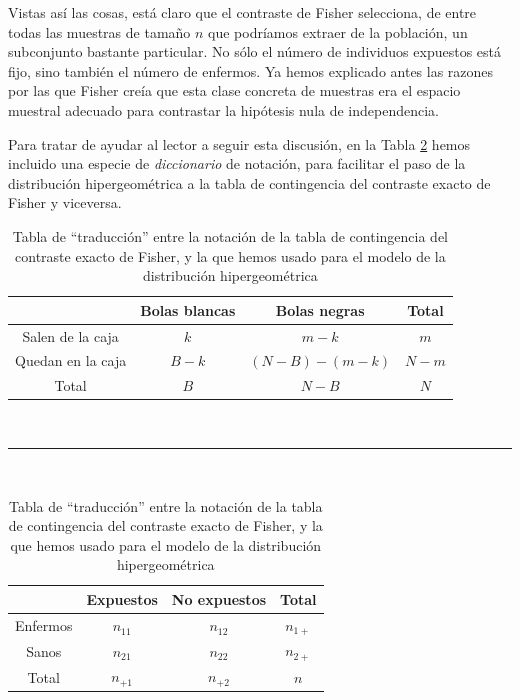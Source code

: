 Vistas así las cosas, está claro que el contraste de Fisher selecciona, de entre todas las muestras de tamaño $n$ que podríamos extraer de la población, un subconjunto bastante particular. No sólo el número de individuos expuestos está fijo, sino también el número de enfermos. Ya hemos explicado antes las razones por las que Fisher creía que esta clase concreta de muestras era el espacio muestral adecuado para contrastar la hipótesis nula de independencia.

Para tratar de ayudar al lector a seguir esta discusión, en la Tabla \ref{cap12:tabla:TraduccionFisherHipergeometrica} hemos incluido una especie de {\em diccionario} de notación, para facilitar el paso de la distribución hipergeométrica a la tabla de contingencia del contraste exacto de Fisher y viceversa.

\begin{table}[ht]
        \begin{center}
        \begin{tabular}{|c|c|c|c|}
          \cline{2-4}
           \multicolumn{1}{c|}{}& Bolas blancas&  Bolas negras & Total \\
           \hline
          Salen de la caja& $k$ & $m-k$ & $m$ \\
          \hline
          Quedan en la caja& $B-k$ & $(N-B)-(m-k)$ &  $N-m$\\
          \hline
          \multicolumn{1}{|c|}{Total} & $B$ & $N-B$ & $N$ \\
          \hline
        \end{tabular}\\[3mm]

        \hrule
        \quad\\[3mm]

        \begin{tabular}{|c|c|c|c|}
          \cline{2-4}
           \multicolumn{1}{c|}{}& Expuestos&  No expuestos & Total \\
           \hline
          Enfermos& $n_{11}$ & $n_{12}$ & $n_{1+}$ \\
          \hline
          Sanos& $n_{21}$ & $n_{22}$ &  $n_{2+}$\\
          \hline
          \multicolumn{1}{|c|}{Total} & $n_{+1}$ & $n_{+2}$ & $n$ \\
          \hline
        \end{tabular}

        \end{center}
\caption{Tabla de ``traducción'' entre la notación de la tabla de contingencia del contraste exacto de Fisher, y la que hemos usado para el modelo de la distribución hipergeométrica}
\label{cap12:tabla:TraduccionFisherHipergeometrica}
\end{table}

